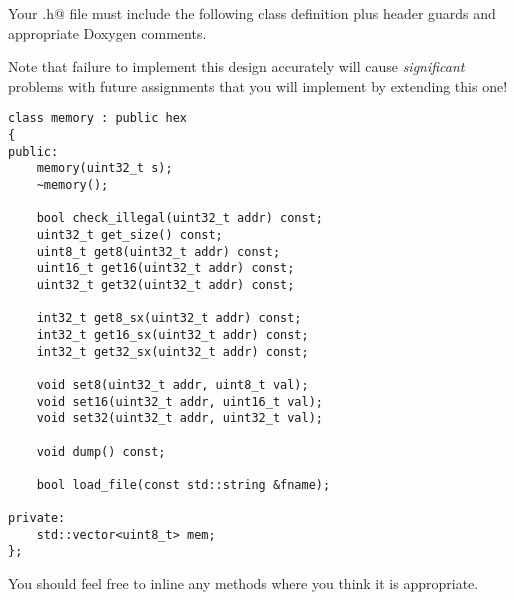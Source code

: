 \documentclass[11pt]{article}
\begin{document}
Your \verb@memory.h@ file must include the following class definition plus header 
guards and appropriate Doxygen comments.

Note that failure to implement this design accurately will cause {\em significant} 
problems with future assignments that you will implement by extending this one!

\begin{minipage}{\textwidth}
\begin{lstlisting}[frame=single, title={class memory}]
class memory : public hex
{
public:
    memory(uint32_t s);
    ~memory();

    bool check_illegal(uint32_t addr) const;
    uint32_t get_size() const;
    uint8_t get8(uint32_t addr) const;
    uint16_t get16(uint32_t addr) const;
    uint32_t get32(uint32_t addr) const;

    int32_t get8_sx(uint32_t addr) const;
    int32_t get16_sx(uint32_t addr) const;
    int32_t get32_sx(uint32_t addr) const;

    void set8(uint32_t addr, uint8_t val);
    void set16(uint32_t addr, uint16_t val);
    void set32(uint32_t addr, uint32_t val);

    void dump() const;

    bool load_file(const std::string &fname);

private:
    std::vector<uint8_t> mem;
};
\end{lstlisting}
\end{minipage}

You should feel free to inline any methods where you think it is appropriate.
\end{document}
